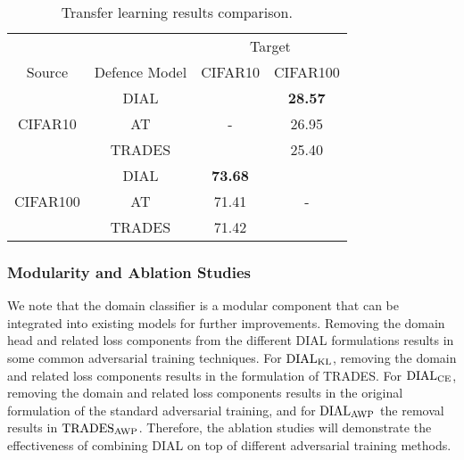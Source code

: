 \begin{table}[H]
  \caption{Transfer learning results comparison.}
  \vskip 0.1in
  \label{transfer-res}
  \centering
  \small
\begin{tabular}{c|c|c|c}
\toprule

\multicolumn{2}{l}{} & \multicolumn{2}{c}{Target} \\
\cmidrule(r){3-4}
Source & Defence Model & CIFAR10 & CIFAR100 \\
\midrule
\multirow{3}{*}{CIFAR10} & DIAL & \multirow{3}{*}{-} & \textbf{28.57} \\
 & AT &  & 26.95  \\
 & TRADES &  & 25.40  \\
 \midrule
\multirow{3}{*}{CIFAR100} & DIAL & \textbf{73.68} & \multirow{3}{*}{-} \\
 & AT & 71.41 & \\
 & TRADES & 71.42 &  \\
\bottomrule
\end{tabular}
\end{table}


\subsubsection{Modularity and Ablation Studies}

We note that the domain classifier is a modular component that can be integrated into existing models for further improvements. Removing the domain head and related loss components from the different DIAL formulations results in some common adversarial training techniques. For $\operatorname{DIAL}_{\operatorname{KL}}$, removing the domain and related loss components results in the formulation of TRADES. For $\operatorname{DIAL}_{\operatorname{CE}}$, removing the domain and related loss components results in the original formulation of the standard adversarial training, and for $\operatorname{DIAL}_{\operatorname{AWP}}$ the removal results in $\operatorname{TRADES}_{\operatorname{AWP}}$. Therefore, the ablation studies will demonstrate the effectiveness of combining DIAL on top of different adversarial training methods. 

